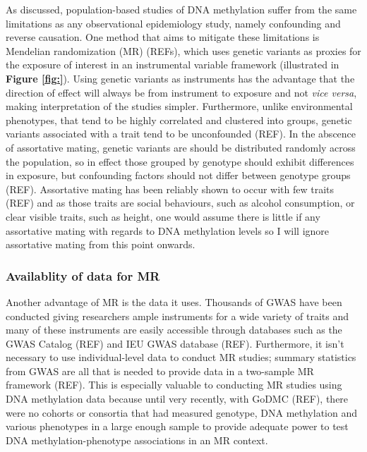 \documentclass[11pt,twoside]{bristolthesis}
\begin{document}
As discussed, population-based studies of DNA methylation suffer from the same limitations as any observational epidemiology study, namely confounding and reverse causation. One method that aims to mitigate these limitations is Mendelian randomization (MR) (REFs), which uses genetic variants as proxies for the exposure of interest in an instrumental variable framework (illustrated in \textbf{Figure \ref{fig:}}). Using genetic variants as instruments has the advantage that the direction of effect will always be from instrument to exposure and not \emph{vice versa}, making interpretation of the studies simpler. Furthermore, unlike environmental phenotypes, that tend to be highly correlated and clustered into groups, genetic variants associated with a trait tend to be unconfounded (REF). In the abscence of assortative mating, genetic variants are should be distributed randomly across the population, so in effect those grouped by genotype should exhibit differences in exposure, but confounding factors should not differ between genotype groups (REF). Assortative mating has been reliably shown to occur with few traits (REF) and as those traits are social behaviours, such as alcohol consumption, or clear visible traits, such as height, one would assume there is little if any assortative mating with regards to DNA methylation levels so I will ignore assortative mating from this point onwards.

\hypertarget{availablity-of-data-for-mr}{%
\subsubsection{Availablity of data for MR}\label{availablity-of-data-for-mr}}

Another advantage of MR is the data it uses. Thousands of GWAS have been conducted giving researchers ample instruments for a wide variety of traits and many of these instruments are easily accessible through databases such as the GWAS Catalog (REF) and IEU GWAS database (REF). Furthermore, it isn't necessary to use individual-level data to conduct MR studies; summary statistics from GWAS are all that is needed to provide data in a two-sample MR framework (REF). This is especially valuable to conducting MR studies using DNA methylation data because until very recently, with GoDMC (REF), there were no cohorts or consortia that had measured genotype, DNA methylation and various phenotypes in a large enough sample to provide adequate power to test DNA methylation-phenotype associations in an MR context.
\end{document}
